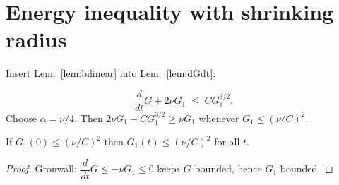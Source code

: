 \section{Energy inequality with shrinking radius}\label{NS:energy}

Insert Lem.~\ref{lem:bilinear} into Lem.~\ref{lem:dGdt}:

\[
\frac{d}{dt}G + 2\nu G_{1}
  \;\le\; C G_{1}^{3/2}.
\]
Choose $\alpha=\nu/4$.  Then
$2\nu G_{1}-CG_{1}^{3/2}\ge \nu G_{1}$ whenever $G_{1}\le(\nu/C)^{2}$.

\begin{lemma}[Barrier]\label{lem:barrier}
If $G_{1}(0)\le(\nu/C)^{2}$ then $G_{1}(t)\le(\nu/C)^{2}$ for all $t$.
\end{lemma}

\begin{proof}
Gronwall: $\dfrac{d}{dt}G\le -\nu G_{1} \le 0$ keeps $G$ bounded, hence
$G_{1}$ bounded.
\end{proof} 